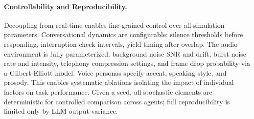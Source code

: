 \paragraph{Controllability and Reproducibility.} Decoupling from real-time enables fine-grained control over all simulation parameters. Conversational dynamics are configurable: silence thresholds before responding, interruption check intervals, yield timing after overlap. The audio environment is fully parameterized: background noise SNR and drift, burst noise rate and intensity, telephony compression settings, and frame drop probability via a Gilbert-Elliott model. Voice personas specify accent, speaking style, and prosody. This enables systematic ablations isolating the impact of individual factors on task performance. Given a seed, all stochastic elements are deterministic for controlled comparison across agents; full reproducibility is limited only by LLM output variance.
